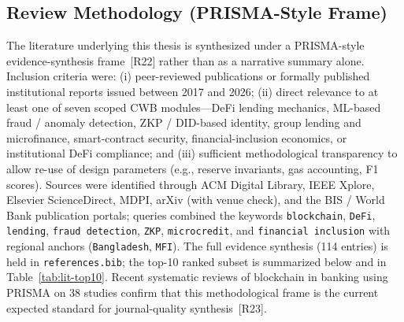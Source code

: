\documentclass[12pt,a4paper]{report}
\begin{document}
\subsection{Review Methodology (PRISMA-Style Frame)}
\label{sec:lit-prisma}

The literature underlying this thesis is synthesized under a PRISMA-style evidence-synthesis frame~[R22] rather than as a narrative summary alone. Inclusion criteria were: (i) peer-reviewed publications or formally published institutional reports issued between 2017 and 2026; (ii) direct relevance to at least one of seven scoped CWB modules---DeFi lending mechanics, ML-based fraud / anomaly detection, ZKP / DID-based identity, group lending and microfinance, smart-contract security, financial-inclusion economics, or institutional DeFi compliance; and (iii) sufficient methodological transparency to allow re-use of design parameters (e.g., reserve invariants, gas accounting, F1 scores). Sources were identified through ACM Digital Library, IEEE Xplore, Elsevier ScienceDirect, MDPI, arXiv (with venue check), and the BIS / World Bank publication portals; queries combined the keywords \texttt{blockchain}, \texttt{DeFi}, \texttt{lending}, \texttt{fraud detection}, \texttt{ZKP}, \texttt{microcredit}, and \texttt{financial inclusion} with regional anchors (\texttt{Bangladesh}, \texttt{MFI}). The full evidence synthesis (114 entries) is held in \texttt{references.bib}; the top-10 ranked subset is summarized below and in Table~\ref{tab:lit-top10}. Recent systematic reviews of blockchain in banking using PRISMA on 38 studies confirm that this methodological frame is the current expected standard for journal-quality synthesis~[R23].
\end{document}
